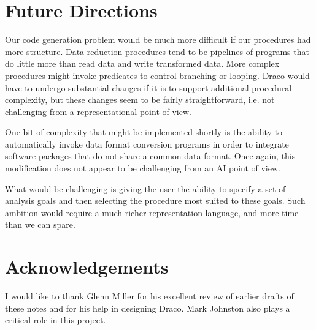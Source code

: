 \section{Future Directions}
Our code generation problem would be much more difficult if our procedures had
more structure.  Data reduction procedures tend to be pipelines of programs
that do little more than read data and write transformed data.  More complex
procedures might invoke predicates to control branching or looping.  Draco
would have to undergo substantial changes if it is to support additional
procedural complexity, but these changes seem to be fairly straightforward,
i.e. not challenging from a representational point of view.

One bit of complexity that might be implemented shortly is the ability to
automatically invoke data format conversion programs in order to integrate
software packages that do not share a common data format.  Once again, this
modification does not appear to be challenging from an AI point of view.

What would be challenging is giving the user the ability to specify a set of
analysis goals and then selecting the procedure most suited to these goals.
Such ambition would require a much richer representation language, and more
time than we can spare.

\section{Acknowledgements}
I would like to thank Glenn Miller for his excellent review of earlier drafts
of these notes and for his help in designing Draco.  Mark Johnston also plays
a critical role in this project.


